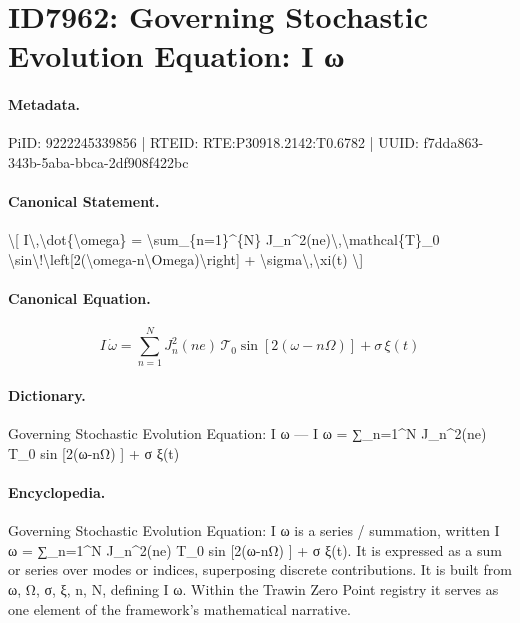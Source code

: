 \section*{ID7962: Governing Stochastic Evolution Equation: I ω}
\paragraph{Metadata.}
PiID: 9222245339856 | RTEID: RTE:P30918.2142:T0.6782 | UUID: f7dda863-343b-5aba-bbca-2df908f422bc

\paragraph{Canonical Statement.}
\textbackslash{}[ I\textbackslash{},\textbackslash{}dot\{\textbackslash{}omega\} = \textbackslash{}sum\_\{n=1\}\textasciicircum{}\{N\} J\_n\textasciicircum{}2(ne)\textbackslash{},\textbackslash{}mathcal\{T\}\_0 \textbackslash{}sin\textbackslash{}!\textbackslash{}left[2(\textbackslash{}omega-n\textbackslash{}Omega)\textbackslash{}right] + \textbackslash{}sigma\textbackslash{},\textbackslash{}xi(t) \textbackslash{}]

\paragraph{Canonical Equation.}
\[
I\,\dot{\omega} = \sum_{n=1}^{N} J_n^2(ne)\,\mathcal{T}_0 \sin\!\left[2(\omega-n\Omega)\right] + \sigma\,\xi(t)
\]

\paragraph{Dictionary.}
Governing Stochastic Evolution Equation: I ω — I ω = ∑\_n=1\textasciicircum{}N J\_n\textasciicircum{}2(ne) T\_0 sin [2(ω-nΩ) ] + σ ξ(t)

\paragraph{Encyclopedia.}
Governing Stochastic Evolution Equation: I ω is a series / summation, written I ω = ∑\_n=1\textasciicircum{}N J\_n\textasciicircum{}2(ne) T\_0 sin [2(ω-nΩ) ] + σ ξ(t). It is expressed as a sum or series over modes or indices, superposing discrete contributions. It is built from ω, Ω, σ, ξ, n, N, defining I ω. Within the Trawin Zero Point registry it serves as one element of the framework's mathematical narrative.
